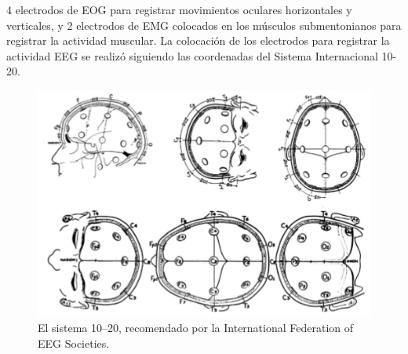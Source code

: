 4 electrodos de EOG para registrar movimientos oculares horizontales y verticales, 
y 2 electrodos de EMG colocados en los m\'usculos submentonianos para registrar la actividad 
muscular. 
La colocaci\'on de los electrodos para registrar la actividad EEG se realiz\'o siguiendo las 
coordenadas del Sistema Internacional 10-20\cite{Coleman87}.

\begin{figure}
\centering
\includegraphics[width=\linewidth]{figura_6.png} 
\caption{El sistema 10--20, recomendado por la
International Federation of EEG Societies. 
}
\end{figure}



